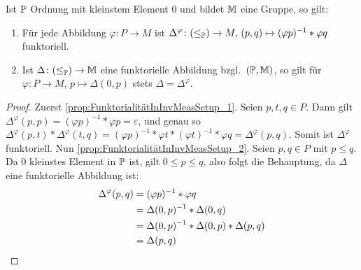\newcommand*{\Dphi}{\ensuremath{\Delta^\varphi}}
\begin{proposition}
    Ist $\P$ Ordnung mit kleinstem Element $0$ und bildet $\M$ eine Gruppe, so
    gilt:
    \begin{enumerate}[label=(\arabic*)]
        \item
            \label{prop:FunktorialitätInInvMeasSetup_1}
            Für jede Abbildung $\varphi\colon P\to M$ ist
            $\Dphi\colon (\leq_\P) \to M,\,
                (p, q) \mapsto (\varphi p)^{-1}*\varphi q$
            funktoriell.
        \item
            \label{prop:FunktorialitätInInvMeasSetup_2}
            Ist $\Delta\colon (\leq_\P)\to \M$ eine funktorielle Abbildung bzgl.~$(\P, \M)$,
            so gilt für $\varphi\colon P\to M,\, p\mapsto \Delta(0, p)$ stets $\Delta = \Dphi$.
    \end{enumerate}
    \begin{proof}

        Zuerst \autoref{prop:FunktorialitätInInvMeasSetup_1}.
        Seien $p, t, q\in P$.
        Dann gilt $\Dphi(p, p) = (\varphi p)^{-1}*\varphi p = \varepsilon$, und
        genau so $\Dphi(p, t)*\Dphi(t, q) = (\varphi p)^{-1}*\varphi t*(\varphi
        t)^{-1}*\varphi q = \Dphi(p, q)$.
        Somit ist $\Dphi$ funktoriell.
        Nun \autoref{prop:FunktorialitätInInvMeasSetup_2}.
        Seien $p, q\in P$ mit $p \leq q$.
        Da $0$ kleinstes Element in $\P$ ist, gilt $0\leq p \leq q$, also folgt die Behauptung, da $\Delta$ eine funktorielle Abbildung ist:
        \begin{align*}
            \Dphi(p, q)
                &= (\varphi p)^{-1}*\varphi q \\
                &= \Delta(0, p)^{-1}*\Delta(0, q) \\
                &= \Delta(0, p)^{-1}*\Delta(0, p)*\Delta(p, q) \\
                &= \Delta(p, q) \qedhere
        \end{align*}
    \end{proof}
\end{proposition}

